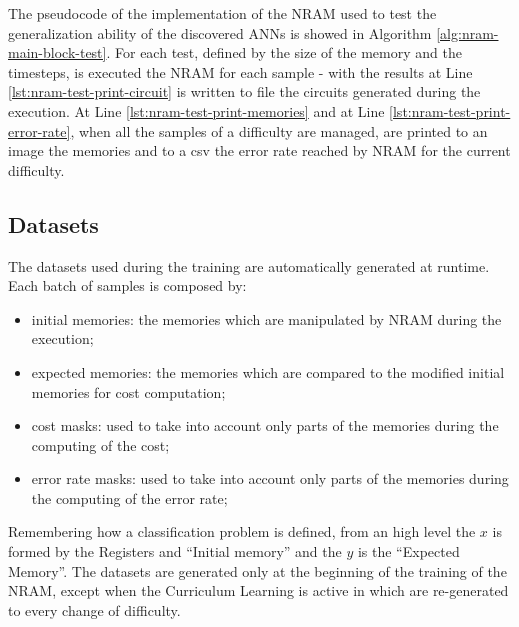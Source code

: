 The pseudocode of the implementation of the NRAM used to test the generalization ability of the discovered ANNs is showed in Algorithm \ref{alg:nram-main-block-test}. For each test, defined by the size of the memory and the timesteps, is executed the NRAM for each sample - with the results at Line \ref{lst:nram-test-print-circuit} is written to file the circuits generated during the execution. At Line \ref{lst:nram-test-print-memories} and at Line \ref{lst:nram-test-print-error-rate}, when all the samples of a difficulty are managed, are printed to an image the memories and to a csv the error rate reached by NRAM for the current difficulty. 

\subsection{Datasets}\label{subsubsec:nram-dataset}
The datasets used during the training are automatically generated at runtime. Each batch of samples is composed by:
\begin{itemize}
	\item{initial memories: the memories which are manipulated by NRAM during the execution;}
	\item{expected memories: the memories which are compared to the modified initial memories for cost computation;}
	\item{cost masks: used to take into account only parts of the memories during the computing of the cost;}
	\item{error rate masks: used to take into account only parts of the memories during the computing of the error rate;}
\end{itemize}
Remembering how a classification problem is defined, from an high level the $x$ is formed by the Registers and ``Initial memory'' and the $y$ is the ``Expected Memory''. The datasets are generated only at the beginning of the training of the NRAM, except when the Curriculum Learning is active in which are re-generated to every change of difficulty.

